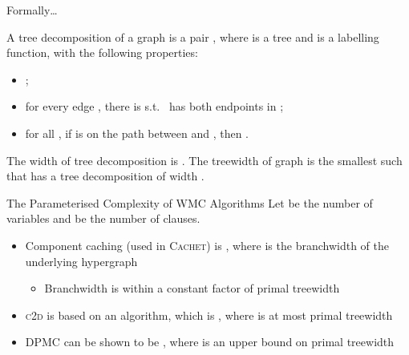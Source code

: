 \documentclass{beamer}
\begin{document}
\begin{frame}{Formally\dots}
\begin{definition}\label{def:treewidth}
  A \alert{tree decomposition} of a graph  is a pair
  , where  is a tree and
   is a labelling
  function, with the following properties:
  \begin{itemize}
    \item {};
    \item for every edge , there is
           s.t.\  has both
          endpoints in ;
    \item for all , if
           is on the path between  and
          , then
          .
  \end{itemize}
  The \alert{width} of tree decomposition  is
  . The \alert{treewidth}
  of graph  is the smallest  such that
   has a tree decomposition of width .
\end{definition}
\end{frame}

\begin{frame}{The Parameterised Complexity of WMC Algorithms}
  Let  be the number of \alert{variables} and  be
  the number of \alert{clauses}.
  \begin{itemize}
    \item Component caching (used in \textsc{Cachet}) is
          , where
           is the \alert{branchwidth} of the underlying
          hypergraph
          \textcolor{gray}{\parencite{DBLP:journals/jair/BacchusDP09}}
          \begin{itemize}
            \item Branchwidth is within a constant factor of primal treewidth
          \end{itemize}
    \item \textsc{c2d} is based on an algorithm, which is
          , where  is at most
          \alert{primal treewidth}
          \textcolor{gray}{\parencite{DBLP:journals/jacm/Darwiche01,DBLP:conf/ecai/Darwiche04}}
    \item \textsc{DPMC} can be shown to be ,
          where  is an upper bound on \alert{primal treewidth}
  \end{itemize}
\end{frame}
\end{document}
